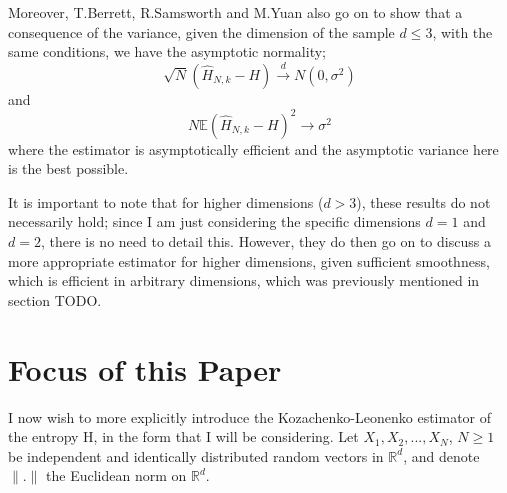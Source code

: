 \documentclass{report}
\begin{document}
Moreover, T.Berrett, R.Samsworth and M.Yuan also go on to show that a consequence of the variance, given the dimension of the sample $d \leq 3$, with the same conditions, we have the asymptotic normality;
\begin{equation}
\sqrt{N}(\hat{H}_{N, k} - H) \xrightarrow{d} N(0, \sigma^2)
\end{equation}
and 
\begin{equation} 
N \mathbb{E}{(\hat{H}_{N, k} - H)^2} \xrightarrow{} \sigma^2
\end{equation}
where the estimator is asymptotically efficient and the asymptotic variance here is the best possible.

It is important to note that for higher dimensions ($d > 3$), these results do not necessarily hold; since I am just considering the specific dimensions $d=1$ and $d=2$, there is no need to detail this. However, they do then go on to discuss a more appropriate estimator for higher dimensions, given sufficient smoothness, which is efficient in arbitrary dimensions, which was previously mentioned in section TODO.




\section{Focus of this Paper}

I now wish to more explicitly introduce the Kozachenko-Leonenko estimator of the entropy H, in the form that I will be considering. Let $X_{1}, X_{2}, ... ,X_{N}$, $N \geq 1$ be independent and identically distributed random vectors in $\mathbb{R}^{d}$, and denote $\|.\|$ the Euclidean norm on $\mathbb{R}^{d}$.
 
\end{document}
